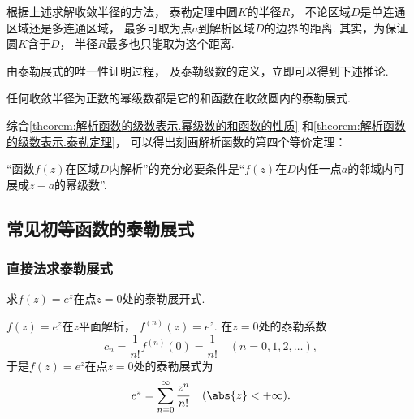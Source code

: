 根据上述求解收敛半径的方法，
泰勒定理中圆\(K\)的半径\(R\)，
不论区域\(D\)是单连通区域还是多连通区域，
最多可取为点\(a\)到解析区域\(D\)的边界的距离.
其实，为保证圆\(K\)含于\(D\)，
半径\(R\)最多也只能取为这个距离.

由泰勒展式的唯一性证明过程，
及泰勒级数的定义，立即可以得到下述推论.
\begin{corollary}
任何收敛半径为正数的幂级数都是它的和函数在收敛圆内的泰勒展式.
\end{corollary}

综合\cref{theorem:解析函数的级数表示.幂级数的和函数的性质}
和\cref{theorem:解析函数的级数表示.泰勒定理}，
可以得出刻画解析函数的第四个等价定理：
\begin{theorem}
“函数\(f(z)\)在区域\(D\)内解析”的充分必要条件是“\(f(z)\)在\(D\)内任一点\(a\)的邻域内可展成\(z-a\)的幂级数”.
\end{theorem}

\subsection{常见初等函数的泰勒展式}
\subsubsection{直接法求泰勒展式}
\begin{example}
求\(f(z) = e^z\)在点\(z = 0\)处的泰勒展开式.
\begin{solution}
\(f(z) = e^z\)在\(z\)平面解析，
\(f^{(n)}(z) = e^z\).
在\(z = 0\)处的泰勒系数\[
	c_n = \frac1{n!} f^{(n)}(0) = \frac1{n!}
	\quad(n=0,1,2,\dotsc),
\]
于是\(f(z) = e^z\)在点\(z = 0\)处的泰勒展式为
\begin{equation}\label{equation:解析函数的级数表示.指数函数的泰勒展式}
	e^z = \sum_{n=0}^\infty \frac{z^n}{n!}
	\quad(\abs{z} < +\infty).
\end{equation}
\end{solution}
\end{example}

